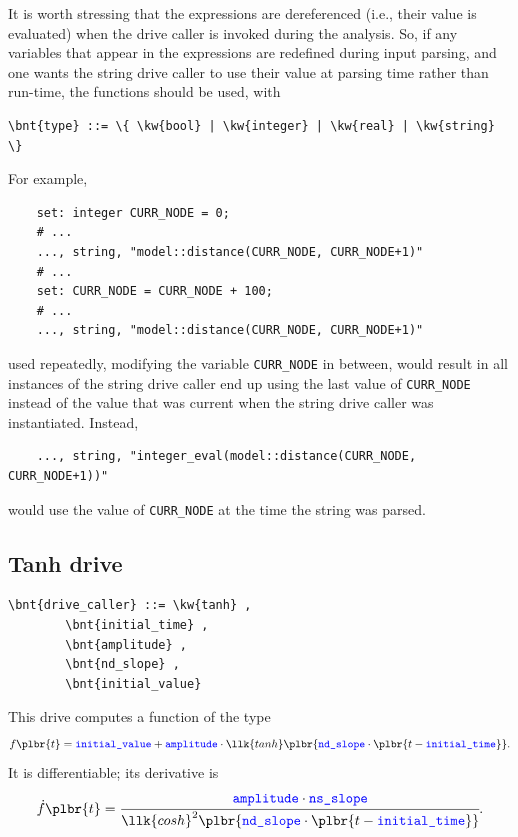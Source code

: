 It is worth stressing that the expressions are dereferenced (i.e., their value is evaluated)
when the drive caller is invoked during the analysis.
So, if any variables that appear in the expressions are redefined during input parsing,
and one wants the string drive caller to use their value at parsing time rather than run-time,
the functions \texttt{} should be used, with
\begin{Verbatim}[commandchars=\\\{\}]
    \bnt{type} ::= \{ \kw{bool} | \kw{integer} | \kw{real} | \kw{string} \}
\end{Verbatim}
For example,
\begin{verbatim}
    set: integer CURR_NODE = 0;
    # ...
    ..., string, "model::distance(CURR_NODE, CURR_NODE+1)"
    # ...
    set: CURR_NODE = CURR_NODE + 100;
    # ...
    ..., string, "model::distance(CURR_NODE, CURR_NODE+1)"
\end{verbatim}
used repeatedly, modifying the variable \texttt{CURR\_NODE} in between, would result in all instances of the string drive caller end up using the last value of \texttt{CURR\_NODE} instead of the value that was current when the string drive caller was instantiated.
Instead,
\begin{verbatim}
    ..., string, "integer_eval(model::distance(CURR_NODE, CURR_NODE+1))"
\end{verbatim}
would use the value of \texttt{CURR\_NODE} at the time the string was parsed.




\subsection{Tanh drive}
\begin{Verbatim}[commandchars=\\\{\}]
    \bnt{drive_caller} ::= \kw{tanh} ,
        \bnt{initial_time} ,
        \bnt{amplitude} ,
        \bnt{nd_slope} ,
        \bnt{initial_value}
\end{Verbatim}
This drive computes a function of the type
\begin{displaymath}
	f\plbr{t} = \nt{initial\_value} + \nt{amplitude} \cdot\llk{tanh}\plbr{
			\nt{nd\_slope} \cdot \plbr{
				t - \nt{initial\_time}
			}
		} .
\end{displaymath}
It is differentiable; its derivative is
\begin{displaymath}
	\dot{f}\plbr{t} = \cfrac{\nt{amplitude} \cdot \nt{ns\_slope}}{\llk{cosh}^2\plbr{
			\nt{nd\_slope} \cdot \plbr{
				t - \nt{initial\_time}
			}
		}} .
\end{displaymath}

